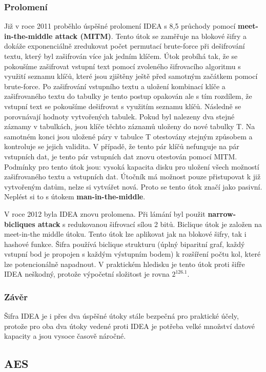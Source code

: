 \documentclass[12pt, a4paper]{article}
\begin{document}
		\subsubsection{Prolomení}
		Již v roce 2011 proběhlo úspěšné prolomení IDEA s 8,5 průchody pomocí \textbf{meet-in-the-middle attack (MITM)}. Tento útok se zaměřuje na blokové šifry a dokáže exponenciálně zredukovat počet permutací  brute-force při dešifrování textu, který byl zašifrován více jak jedním klíčem. Útok probíhá tak, že se pokoušíme zašifrovat vstupní text pomocí zvoleného šifrovacího algoritmu s využití seznamu klíčů, které jsou zjištěny ještě před samotným začátkem pomocí brute-force. Po zašifrování vstupního textu a uložení kombinací klíče a zašifrovaného textu do tabulky je tento postup opakován ale s tím rozdílem, že vstupní text se pokoušíme dešifrovat s využitím seznamu klíčů. Následně se porovnávají hodnoty vytvořených tabulek. Pokud byl nalezeny dva stejné záznamy v tabulkách, jsou klíče těchto záznamů uloženy do nové tabulky T. Na samotném konci jsou uložené páry v tabulce T otestovány stejným způsobem a kontroluje se jejich validita. V případě, že tento pár klíčů nefunguje na pár vstupních dat, je tento pár vstupních dat znovu otestován pomocí MITM.   Podmínky pro tento útok jsou: vysoká kapacita disku pro uložení všech možností zašifrovaného textu a vstupních dat. Útočník má možnost pouze přistupovat k již vytvořeným datům, nelze si vytvářet nová. Proto se tento útok značí jako pasivní. Neplést si to s útokem \textbf{man-in-the-middle}.
		\par
		V roce 2012 byla IDEA znovu prolomena. Při lámání byl použit \textbf{narrow-bicliques attack} s redukovanou šifrovací sílou 2 bitů. Biclique útok je založen na meet-in-the middle útoku. Tento útok lze aplikovat jak na blokové šifry, tak i hashové funkce. Šifra používá biclique strukturu (úplný biparitní graf, každý vstupní bod je propojen s každým výstupním bodem) k rozšíření počtu kol, které lze potencionálně napadnout. V praktickém hledisku je tento útok proti šifře IDEA neškodný, protože výpočetní složitost je rovna $2^{126.1}$.
		\subsubsection{Závěr}
		Šifra IDEA je i přes dva úspěšné útoky stále bezpečná pro praktické účely, protože pro oba dva útoky vedené proti IDEA je potřeba velké množství datové kapacity a jsou vysoce časově náročné. 
	\subsection{AES}
	\label{subsec:aes}
\end{document}
